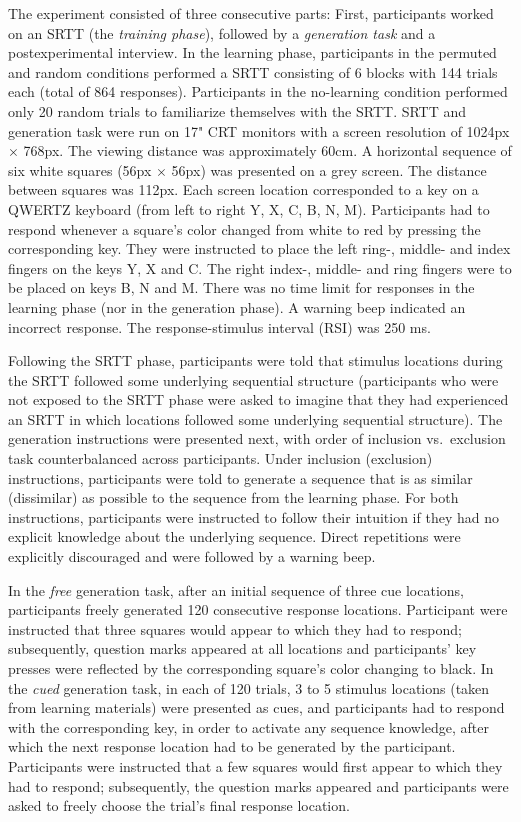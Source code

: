 \documentclass[
  english,
  man]{apa6}
\begin{document}
The experiment consisted of three consecutive parts: First, participants worked on an SRTT (the \emph{training phase}), followed by a \emph{generation task} and a postexperimental interview.
In the learning phase, participants in the permuted and random conditions performed a SRTT consisting of 6 blocks with 144 trials each (total of 864 responses).
Participants in the no-learning condition performed only 20 random trials to familiarize themselves with the SRTT.
SRTT and generation task were run on 17" CRT monitors with a screen resolution of 1024px \(\times\) 768px. The viewing distance was approximately 60cm.
A horizontal sequence of six white squares (56px \(\times\) 56px) was presented on a grey screen. The distance between squares was 112px.
Each screen location corresponded to a key on a QWERTZ keyboard (from left to right Y, X, C, B, N, M).
Participants had to respond whenever a square's color changed from white to red by pressing the corresponding key.
They were instructed to place the left ring-, middle- and index fingers on the keys Y, X and C.
The right index-, middle- and ring fingers were to be placed on keys B, N and M.
There was no time limit for responses in the learning phase (nor in the generation phase).
A warning beep indicated an incorrect response.
The response-stimulus interval (RSI) was 250 ms.

Following the SRTT phase, participants were told that stimulus locations during the SRTT followed some underlying sequential structure (participants who were not exposed to the SRTT phase were asked to imagine that they had experienced an SRTT in which locations followed some underlying sequential structure).
The generation instructions were presented next, with order of inclusion vs.~exclusion task counterbalanced across participants.
Under inclusion (exclusion) instructions, participants were told to generate a sequence that is as similar (dissimilar) as possible to the sequence from the learning phase.
For both instructions, participants were instructed to follow their intuition if they had no explicit knowledge about the underlying sequence.
Direct repetitions were explicitly discouraged and were followed by a warning beep.

In the \emph{free} generation task, after an initial sequence of three cue locations, participants freely generated 120 consecutive response locations.
Participant were instructed that three squares would appear to which they had to respond; subsequently, question marks appeared at all locations and participants' key presses were reflected by the corresponding square's color changing to black.
In the \emph{cued} generation task, in each of 120 trials, 3 to 5 stimulus locations (taken from learning materials) were presented as cues, and participants had to respond with the corresponding key, in order to activate any sequence knowledge, after which the next response location had to be generated by the participant.
Participants were instructed that a few squares would first appear to which they had to respond; subsequently, the question marks appeared and participants were asked to freely choose the trial's final response location.
\end{document}
